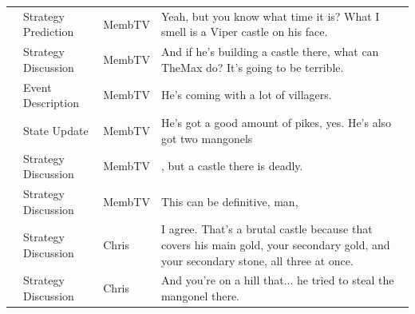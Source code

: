 {\begin{longtable}{@{}>{\theAppRow}r|L{2.3cm}L{1.0cm}U{11.55cm}@{}}
    & Strategy Prediction   & MembTV       & Yeah, but you know what time it is? What I smell is a Viper castle on his face.                                                                                                                                                                                  \\
    & Strategy Discussion   & MembTV       & And if he's building a castle there, what can TheMax do? It's going to be terrible.                                                                                                                                                                              \\
    & Event Description     & MembTV       & He's coming with a lot of villagers.                                                                                                                                                                                                                             \\
    & State Update          & MembTV       & He's got a good amount of pikes, yes. He's also got two mangonels                                                                                                                                                                                                \\
    & Strategy Discussion   & MembTV       & , but a castle there is deadly.                                                                                                                                                                                                                                  \\
    & Strategy Discussion   & MembTV       & This can be definitive, man,                                                                                                                                                                                                                                     \\
    & Strategy Discussion   & Chris        & I agree. That's a brutal castle because that covers his main gold, your secondary gold, and your secondary stone, all three at once.                                                                                                                             \\
    & Strategy Discussion   & Chris        & And you're on a hill that... he tried to steal the mangonel there.                                                                                                                                                                                               \\

\end{longtable}}
